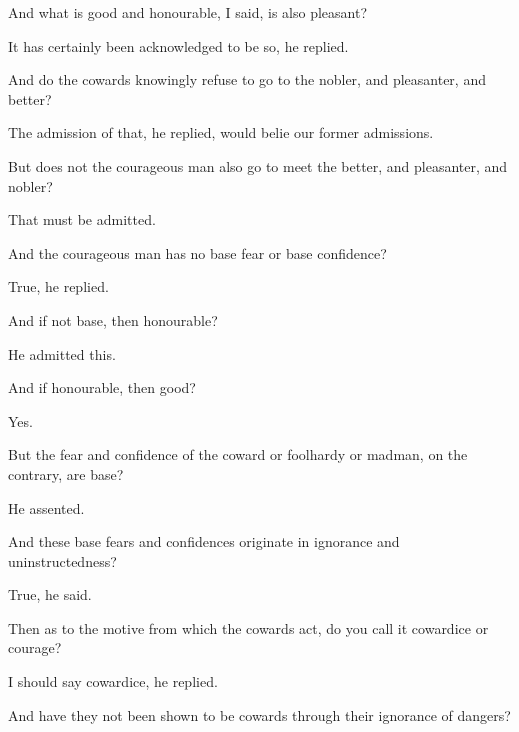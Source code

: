 \documentclass[11pt,letter]{article}
\begin{document}
\par  And what is good and honourable, I said, is also pleasant?

\par  It has certainly been acknowledged to be so, he replied.

\par  And do the cowards knowingly refuse to go to the nobler, and pleasanter, and better?

\par  The admission of that, he replied, would belie our former admissions.

\par  But does not the courageous man also go to meet the better, and pleasanter, and nobler?

\par  That must be admitted.

\par  And the courageous man has no base fear or base confidence?

\par  True, he replied.

\par  And if not base, then honourable?

\par  He admitted this.

\par  And if honourable, then good?

\par  Yes.

\par  But the fear and confidence of the coward or foolhardy or madman, on the contrary, are base?

\par  He assented.

\par  And these base fears and confidences originate in ignorance and uninstructedness?

\par  True, he said.

\par  Then as to the motive from which the cowards act, do you call it cowardice or courage?

\par  I should say cowardice, he replied.

\par  And have they not been shown to be cowards through their ignorance of dangers?
\end{document}
